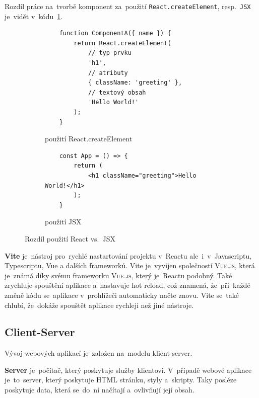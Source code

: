 \documentclass[14pt,a4paper]{article}
\begin{document}
        Rozdíl práce na~tvorbě komponent za~použití \texttt{React.createElement}, resp.~\texttt{JSX} je~vidět v~kódu~\ref{code:ComponentJSX}.
        \begin{figure}
            \begin{subfigure}[b]{0.45\linewidth}
                \begin{verbatim}
    function ComponentA({ name }) {
        return React.createElement(
            // typ prvku
            'h1',
            // atributy
            { className: 'greeting' },
            // textový obsah
            'Hello World!'
        );
    }
                \end{verbatim}
                \caption{použití React.createElement}
            \end{subfigure}
            \hfill
            \begin{subfigure}[b]{0.45\linewidth}
                \begin{verbatim}
    const App = () => {
        return (
            <h1 className="greeting">Hello World!</h1>
        );
    }
                \end{verbatim}
                \vspace{1cm}
                \caption{použití JSX}
            \end{subfigure}
            \label{code:ComponentJSX}
            \caption{Rozdíl použití React vs.~JSX}
        \end{figure}

        \textbf{Vite} je~nástroj pro~rychlé nastartování projektu v~Reactu ale~i~v~Javascriptu, Typescriptu, Vue a dalších frameworků.
        Vite je~vyvíjen společností \textsc{Vue.js}, která je~známá díky svému frameworku \textsc{Vue.js}, který je~Reactu podobný.
        Také zrychluje spouštění aplikace a~nastavuje hot reload, což znamená, že~při~každé změně kódu se~aplikace v~prohlížeči automaticky načte znovu.
        Vite se~také chlubí, že~dokáže spouštět aplikace rychleji než jiné nástroje.\parencite{vitejs}
        
        \subsection{Client-Server}
        Vývoj webových aplikací je~založen na~modelu klient-server.
        
        \textbf{Server} je~počítač, který poskytuje služby klientovi. V~případě webové aplikace je~to~server, který poskytuje HTML stránku, styly a~skripty.
        Taky posléze poskytuje data, která se~do~ní načítají a~ovlivňují její obsah.
\end{document}

